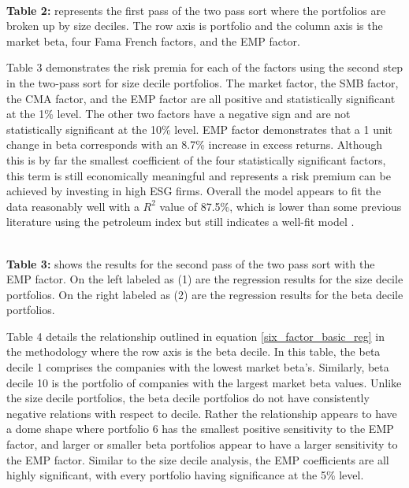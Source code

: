\begin{center}
    \paperspacingnarrow
    \\
    \textbf{Table 2:} represents the first pass of the two pass sort where the portfolios are broken up by size deciles. The row axis is portfolio and the column axis is the  market beta, four Fama French factors, and the EMP factor.\\
    \paperspacingwide
\end{center}
Table 3 demonstrates the risk premia for each of the factors using the second step in the two-pass sort for size decile portfolios. The market factor, the SMB factor, the CMA factor, and the EMP factor are all positive and statistically significant at the 1\% level. The other two factors have a negative sign and are not statistically significant at the 10\% level.  EMP factor demonstrates that a 1 unit change in beta corresponds with an 8.7\% increase in excess returns. Although this is by far the smallest coefficient of the four statistically significant factors, this term is still economically meaningful and represents a risk premium can be achieved by investing in high ESG firms. Overall the model appears to fit the data reasonably well with a $R^2$ value of 87.5\%, which is lower than some previous literature using the petroleum index but still indicates a well-fit model \cite{Gregory2020TheGP}.


\begin{center}
    \paperspacingnarrow
    \\
    \textbf{Table 3:} shows the results for the second pass of the two pass sort with the EMP factor. On the left labeled as (1) are the regression results for the size decile portfolios. On the right labeled as (2) are the regression results for the beta decile portfolios.\\
    \paperspacingwide
\end{center}

Table 4 details the relationship outlined in equation \eqref{six_factor_basic_reg} in the methodology where the row axis is the beta decile. In this table,  the beta decile 1 comprises the companies with the lowest market beta's. Similarly, beta decile 10 is the portfolio of companies with the largest market beta values.  Unlike the size decile portfolios, the beta decile portfolios do not have consistently negative relations with respect to decile. Rather the relationship appears to have a dome shape where portfolio 6 has the smallest positive sensitivity to the EMP factor, and larger or smaller beta portfolios appear to have a larger sensitivity to the  EMP factor. Similar to the size decile analysis, the EMP coefficients are all highly significant, with every portfolio having significance at the 5\% level. 

